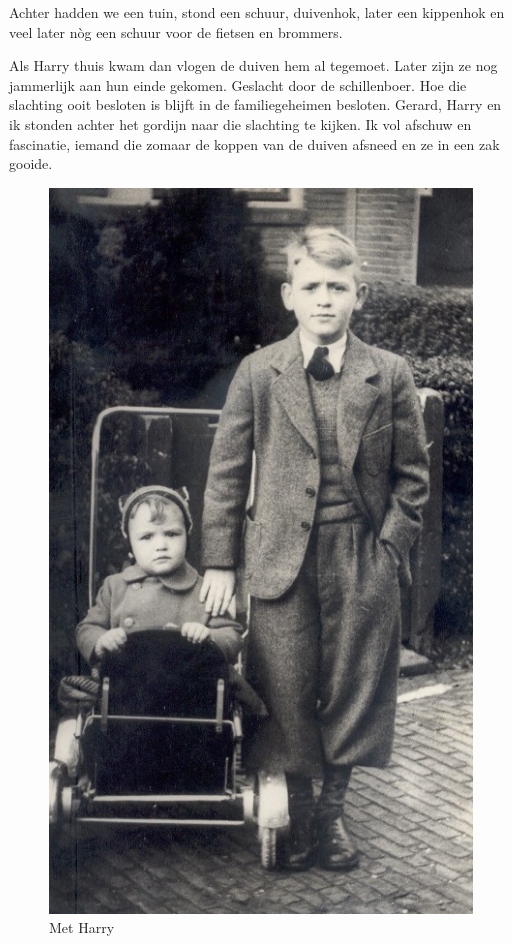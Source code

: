 \documentclass[12pt,twoside]{memoir}
\begin{document}
Achter hadden we een tuin, stond een schuur, duivenhok, later een kippenhok en veel later nòg een schuur voor de fietsen en brommers. 

Als Harry thuis kwam dan vlogen de duiven hem al tegemoet. Later zijn ze nog jammerlijk aan hun einde gekomen. Geslacht door de schillenboer. Hoe die slachting ooit besloten is blijft in de familiegeheimen besloten. Gerard, Harry en ik stonden achter het gordijn naar die slachting te kijken. Ik vol afschuw en fascinatie, iemand die zomaar de koppen van de duiven afsneed en ze in een zak gooide.

\begin{figure}
\includegraphics[width=\textwidth]{img/ch5/RuudHarry2}
\caption*{\footnotesize Met Harry}
\end{figure}
\end{document}
